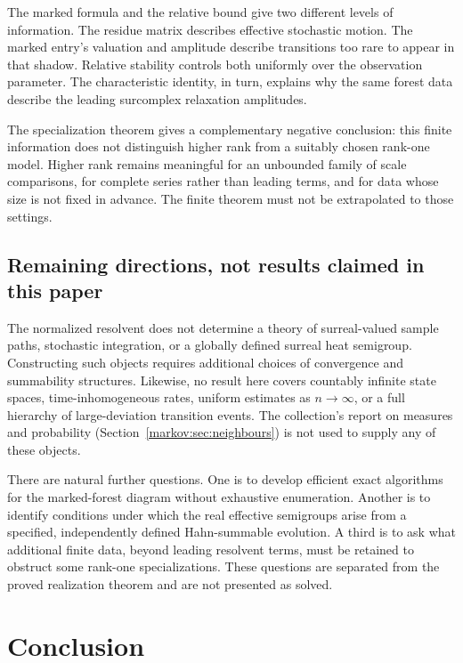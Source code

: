 \documentclass[11pt]{article}
\numberwithin{equation}{section}
\theoremstyle{definition}
\theoremstyle{remark}
\begin{document}
The marked formula and the relative bound give two different levels of
information. The residue matrix describes effective stochastic motion.
The marked entry's valuation and amplitude describe transitions too rare to
appear in that shadow. Relative stability controls both uniformly over the
observation parameter. The characteristic identity, in turn, explains why the
same forest data describe the leading surcomplex relaxation amplitudes.

The specialization theorem gives a complementary negative conclusion:
this finite information does not distinguish higher rank from a suitably chosen
rank-one model. Higher rank remains meaningful for an unbounded family of scale
comparisons, for complete series rather than leading terms, and for data whose
size is not fixed in advance. The finite theorem must not be extrapolated to
those settings.

\subsection{Remaining directions, not results claimed in this paper}\label{markov:sec:directions}

The normalized resolvent does not determine a theory of surreal-valued sample
paths, stochastic integration, or a globally defined surreal heat semigroup.
Constructing such objects requires additional choices of convergence and
summability structures. Likewise, no result here covers countably infinite state
spaces, time-inhomogeneous rates, uniform estimates as $n\to\infty$, or a full
hierarchy of large-deviation transition events. The collection's report on
measures and probability (Section~\ref{markov:sec:neighbours}) is not used to
supply any of these objects.

There are natural further questions. One is to develop efficient exact algorithms
for the marked-forest diagram without exhaustive enumeration. Another is to
identify conditions under which the real effective semigroups arise from a
specified, independently defined Hahn-summable evolution. A third is to ask what
additional finite data, beyond leading resolvent terms, must be retained to
obstruct some rank-one specializations. These questions are separated from the
proved realization theorem and are not presented as solved.

\section{Conclusion}
\end{document}
